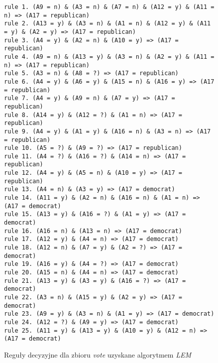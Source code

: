 \begin{figure}
\begin{verbatim}
rule 1. (A9 = n) & (A3 = n) & (A7 = n) & (A12 = y) & (A11 = n) => (A17 = republican)
rule 2. (A13 = y) & (A3 = n) & (A1 = n) & (A12 = y) & (A11 = y) & (A2 = y) => (A17 = republican)
rule 3. (A4 = y) & (A2 = n) & (A10 = y) => (A17 = republican)
rule 4. (A9 = n) & (A13 = y) & (A3 = n) & (A2 = y) & (A11 = n) => (A17 = republican)
rule 5. (A3 = n) & (A8 = ?) => (A17 = republican)
rule 6. (A4 = y) & (A6 = y) & (A15 = n) & (A16 = y) => (A17 = republican)
rule 7. (A4 = y) & (A9 = n) & (A7 = y) => (A17 = republican)
rule 8. (A14 = y) & (A12 = ?) & (A1 = n) => (A17 = republican)
rule 9. (A4 = y) & (A1 = y) & (A16 = n) & (A3 = n) => (A17 = republican)
rule 10. (A5 = ?) & (A9 = ?) => (A17 = republican)
rule 11. (A4 = ?) & (A16 = ?) & (A14 = n) => (A17 = republican)
rule 12. (A4 = y) & (A5 = n) & (A10 = y) => (A17 = republican)
rule 13. (A4 = n) & (A3 = y) => (A17 = democrat)
rule 14. (A11 = y) & (A2 = n) & (A16 = n) & (A1 = n) => (A17 = democrat)
rule 15. (A13 = y) & (A16 = ?) & (A1 = y) => (A17 = democrat)
rule 16. (A16 = n) & (A13 = n) => (A17 = democrat)
rule 17. (A12 = y) & (A4 = n) => (A17 = democrat)
rule 18. (A12 = n) & (A7 = y) & (A2 = ?) => (A17 = democrat)
rule 19. (A16 = y) & (A4 = ?) => (A17 = democrat)
rule 20. (A15 = n) & (A4 = n) => (A17 = democrat)
rule 21. (A13 = y) & (A3 = y) & (A16 = ?) => (A17 = democrat)
rule 22. (A3 = n) & (A15 = y) & (A2 = y) => (A17 = democrat)
rule 23. (A9 = y) & (A3 = n) & (A1 = y) => (A17 = democrat)
rule 24. (A12 = ?) & (A9 = y) => (A17 = democrat)
rule 25. (A11 = y) & (A13 = y) & (A10 = y) & (A12 = n) => (A17 = democrat)
\end{verbatim}
\caption{Reguły decyzyjne dla zbioru \emph{vote} uzyskane algorytmem \emph{LEM}}
\label{p2t2-vote-rules}
\end{figure}
